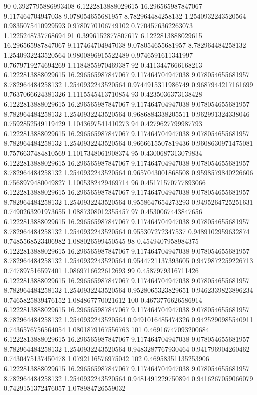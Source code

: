 {90 0.3927795886993408 6.1222813888029615 16.296565987847067 9.117464704947038 9.078054655681957 8.782964484258132 1.2540932243520564 0.9835075410929593 0.9780770106749102 0.7704576362263073 1.1225248737768694
91 0.3996152877807617 6.1222813888029615 16.296565987847067 9.117464704947038 9.078054655681957 8.782964484258132 1.2540932243520564 0.9800896915522489 0.9746591611341997 0.7679719274694269 1.1184855970469387
92 0.4113447666168213 6.1222813888029615 16.296565987847067 9.117464704947038 9.078054655681957 8.782964484258132 1.2540932243520564 0.9744915311986749 0.9687944217161699 0.7637066624381326 1.1115545413710854
93 0.4235036373138428 6.1222813888029615 16.296565987847067 9.117464704947038 9.078054655681957 8.782964484258132 1.2540932243520564 0.9686884338205511 0.962991324338046 0.7592852549119429 1.1043697541410273
94 0.4279627799987793 6.1222813888029615 16.296565987847067 9.117464704947038 9.078054655681957 8.782964484258132 1.2540932243520564 0.9666615507819436 0.9608630971475081 0.7576637484810569 1.1017348061908374
95 0.4300687313079834 6.1222813888029615 16.296565987847067 9.117464704947038 9.078054655681957 8.782964484258132 1.2540932243520564 0.9657043001868508 0.9598579840226606 0.7568979480049827 1.1005382429469714
96 0.45171570777893066 6.1222813888029615 16.296565987847067 9.117464704947038 9.078054655681957 8.782964484258132 1.2540932243520564 0.9558647654273293 0.9495264725251631 0.7490263201973655 1.0887308012355457
97 0.4530067443847656 6.1222813888029615 16.296565987847067 9.117464704947038 9.078054655681957 8.782964484258132 1.2540932243520564 0.955307272347537 0.9489102959632874 0.7485568523406982 1.088026599450545
98 0.4549407958984375 6.1222813888029615 16.296565987847067 9.117464704947038 9.078054655681957 8.782964484258132 1.2540932243520564 0.9544721137393605 0.9479872259226713 0.747897516597401 1.0869716622612693
99 0.4587979316711426 6.1222813888029615 16.296565987847067 9.117464704947038 9.078054655681957 8.782964484258132 1.2540932243520564 0.9528065323829651 0.9462339823896234 0.7465825839476152 1.084867770021612
100 0.4673776626586914 6.1222813888029615 16.296565987847067 9.117464704947038 9.078054655681957 8.782964484258132 1.2540932243520564 0.9491016485474326 0.9425290985540911 0.7436576756564054 1.0801879167556763
101 0.46916747093200684 6.1222813888029615 16.296565987847067 9.117464704947038 9.078054655681957 8.782964484258132 1.2540932243520564 0.9483287767930464 0.941796904260462 0.7430475137450478 1.0792116576975042
102 0.46958351135253906 6.1222813888029615 16.296565987847067 9.117464704947038 9.078054655681957 8.782964484258132 1.2540932243520564 0.9481491229750894 0.9416267059066079 0.7429151372476057 1.078984726559032
}

